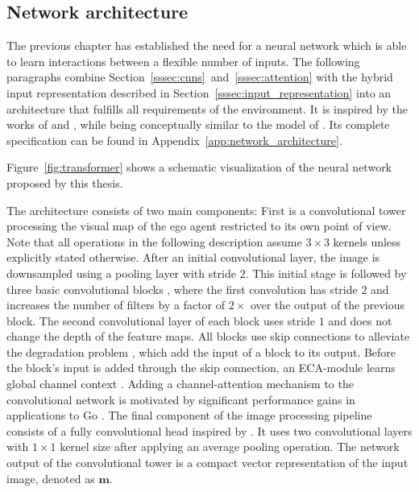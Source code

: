 \subsection{Network architecture}\label{ssec:network_architecture}
The previous chapter has established the need for a neural network which is able to learn interactions between a flexible number of inputs. The following paragraphs combine Section~\ref{sssec:cnns}~and~\ref{sssec:attention} with the hybrid input representation described in Section~\ref{sssec:input_representation} into an architecture that fulfills all requirements of the environment. It is inspired by the works of \cite{kurzerAcceleratingCooperativePlanning2020} and \cite{devlinBERTPretrainingDeep2019}, while being conceptually similar to the model of \cite{wrightNeuralAttentionalArchitecturesDeep}. Its complete specification can be found in Appendix~\ref{app:network_architecture}.

Figure~\ref{fig:transformer} shows a schematic visualization of the neural network proposed by this thesis.

The architecture consists of two main components: First is a convolutional tower processing the visual map of the ego agent restricted to its own point of view. Note that all operations in the following description assume $3 \times 3$ kernels unless explicitly stated otherwise. After an initial convolutional layer, the image is downsampled using a pooling layer with stride $2$. This initial stage is followed by three basic convolutional blocks \cite{heDeepResidualLearning2015}, where the first convolution has stride $2$ and increases the number of filters by a factor of $2 \times$ over the output of the previous block. The second convolutional layer of each block uses stride $1$ and does not change the depth of the feature maps. All blocks use skip connections to alleviate the degradation problem \cite{heDeepResidualLearning2015}, which add the input of a block to its output. Before the block's input is added through the skip connection, an ECA-module learns global channel context \cite{wangECANetEfficientChannel2020}. Adding a channel-attention mechanism to the convolutional network is motivated by significant performance gains in applications to Go \cite{wuAcceleratingSelfPlayLearning2020}. The final component of the image processing pipeline consists of a fully convolutional head inspired by \cite{howardSearchingMobileNetV32019}. It uses two convolutional layers with $1 \times 1$ kernel size after applying an average pooling operation. The network output of the convolutional tower is a compact vector representation of the input image, denoted as $\mathbf m$.

